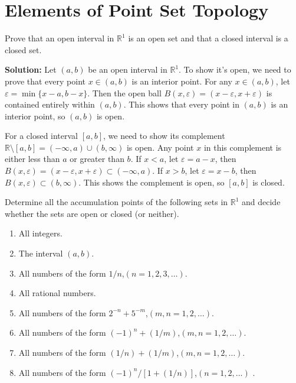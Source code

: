 \chapter{Elements of Point Set Topology}

\begin{problembox}
Prove that an open interval in $\mathbb{R}^1$ is an open set and that a closed interval is a closed set.
\end{problembox}

\textbf{Solution:} Let $(a,b)$ be an open interval in $\mathbb{R}^1$. To show it's open, we need to prove that every point $x \in (a,b)$ is an interior point. For any $x \in (a,b)$, let $\varepsilon = \min\{x-a, b-x\}$. Then the open ball $B(x,\varepsilon) = (x-\varepsilon, x+\varepsilon)$ is contained entirely within $(a,b)$. This shows that every point in $(a,b)$ is an interior point, so $(a,b)$ is open.

For a closed interval $[a,b]$, we need to show its complement $\mathbb{R} \setminus [a,b] = (-\infty,a) \cup (b,\infty)$ is open. Any point $x$ in this complement is either less than $a$ or greater than $b$. If $x < a$, let $\varepsilon = a-x$, then $B(x,\varepsilon) = (x-\varepsilon, x+\varepsilon) \subset (-\infty,a)$. If $x > b$, let $\varepsilon = x-b$, then $B(x,\varepsilon) \subset (b,\infty)$. This shows the complement is open, so $[a,b]$ is closed.

\begin{problembox}
Determine all the accumulation points of the following sets in $\mathbb{R}^1$ and decide whether the sets are open or closed (or neither).
\begin{enumerate}[label=\textbf{(\alph*)}]
\item All integers.
\item The interval $(a, b)$.
\item All numbers of the form $1/n$,\quad $(n = 1, 2, 3, \dots)$.
\item All rational numbers.
\item All numbers of the form $2^{-n} + 5^{-m}$,\quad $(m, n = 1, 2, \dots)$.
\item All numbers of the form $(-1)^n + (1/m)$,\quad $(m, n = 1, 2, \dots)$.
\item All numbers of the form $(1/n) + (1/m)$,\quad $(m, n = 1, 2, \dots)$.
\item All numbers of the form $(-1)^n / [1 + (1/n)]$,\quad $(n = 1, 2, \dots)$
.
\end{enumerate}
\end{problembox}

